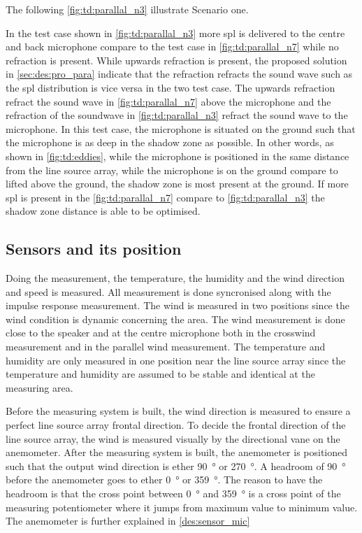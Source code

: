  The following \autoref{fig:td:parallal_n3} illustrate Scenario one.


In the test case shown in \autoref{fig:td:parallal_n3} more \gls{spl} is delivered to the centre and back microphone compare to the test case in  \autoref{fig:td:parallal_n7} while no refraction is present. While upwards refraction is present, the proposed solution in \autoref{sec:des:pro_para} indicate that the refraction refracts the sound wave such as the \gls{spl} distribution is vice versa in the two test case. The upwards refraction refract the sound wave in \autoref{fig:td:parallal_n7} above the microphone and the refraction of the soundwave in \autoref{fig:td:parallal_n3} refract the sound wave to the microphone.
In this test case, the microphone is situated on the ground such that the microphone is as deep in the shadow zone as possible. In other words, as shown in \autoref{fig:td:eddies}, while the microphone is positioned in the same distance from the line source array, while the microphone is on the ground compare to lifted above the ground, the shadow zone is most present at the ground. If more \gls{spl} is present in the \autoref{fig:td:parallal_n7} compare to \autoref{fig:td:parallal_n3} the shadow zone distance is able to be optimised.

\subsection{Sensors and its position}
Doing the measurement, the temperature, the humidity and the wind direction and speed is measured. All measurement is done syncronised along with the impulse response measurement. The wind is measured in two positions since the wind condition is dynamic concerning the area. The wind measurement is done close to the speaker and at the centre microphone both in the crosswind measurement and in the parallel wind measurement. The temperature and humidity are only measured in one position near the line source array since the temperature and humidity are assumed to be stable and identical at the measuring area. 

Before the measuring system is built, the wind direction is measured to ensure a perfect line source array frontal direction. To decide the frontal direction of the line source array, the wind is measured visually by the directional vane on the anemometer. After the measuring system is built, the anemometer is positioned such that the output wind direction is ether \SI{90}{\degree} or \SI{270}{\degree}. A headroom of \SI{90}{\degree} before the anemometer goes to ether \SI{0}{\degree} or \SI{359}{\degree}. The reason to have the headroom is that the cross point between \SI{0}{\degree} and \SI{359}{\degree} is a cross point of the measuring potentiometer where it jumps from maximum value to minimum value. The anemometer is further explained in \autoref{des:sensor_mic}


